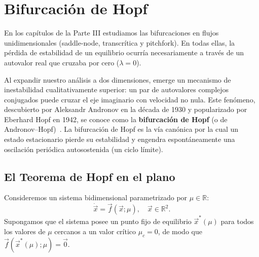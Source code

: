 \section{Bifurcación de Hopf}
\label{sec:hopf}

En los capítulos de la Parte III estudiamos las bifurcaciones en flujos unidimensionales (saddle-node, transcrítica y pitchfork). En todas ellas, la pérdida de estabilidad de un equilibrio ocurría necesariamente a través de un autovalor real que cruzaba por cero ($\lambda = 0$).

Al expandir nuestro análisis a dos dimensiones, emerge un mecanismo de inestabilidad cualitativamente superior: un par de autovalores complejos conjugados puede cruzar el eje imaginario con velocidad no nula. Este fenómeno, descubierto por Aleksandr Andronov en la década de 1930 y popularizado por Eberhard Hopf en 1942, se conoce como la \textbf{bifurcación de Hopf} (o de Andronov--Hopf)~\cite{strogatz2015,murray2002}. La bifurcación de Hopf es la vía canónica por la cual un estado estacionario pierde su estabilidad y engendra espontáneamente una oscilación periódica autosostenida (un ciclo límite).

\subsection{El Teorema de Hopf en el plano}

Consideremos un sistema bidimensional parametrizado por $\mu \in \mathbb{R}$:
\begin{equation}
    \dot{\vec{x}} = \vec{f}(\vec{x}; \mu), \quad \vec{x} \in \mathbb{R}^2.
\end{equation}
Supongamos que el sistema posee un punto fijo de equilibrio $\vec{x}^*(\mu)$ para todos los valores de $\mu$ cercanos a un valor crítico $\mu_c = 0$, de modo que $\vec{f}(\vec{x}^*(\mu); \mu) = \vec{0}$.

